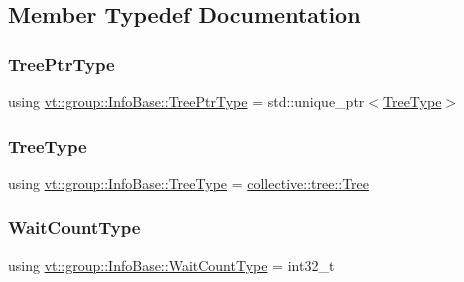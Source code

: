 \subsection{Member Typedef Documentation}
\mbox{\label{structvt_1_1group_1_1_info_base_af1111ac71e1ee7a009f00ebece27c3a3}} 
\subsubsection{\texorpdfstring{Tree\+Ptr\+Type}{TreePtrType}}
{\footnotesize\ttfamily using \hyperlink{structvt_1_1group_1_1_info_base_af1111ac71e1ee7a009f00ebece27c3a3}{vt\+::group\+::\+Info\+Base\+::\+Tree\+Ptr\+Type} =  std\+::unique\+\_\+ptr$<$\hyperlink{structvt_1_1group_1_1_info_base_a96e01b6097ed7b2bc299027d0a7a1b1e}{Tree\+Type}$>$}

\mbox{\label{structvt_1_1group_1_1_info_base_a96e01b6097ed7b2bc299027d0a7a1b1e}} 
\subsubsection{\texorpdfstring{Tree\+Type}{TreeType}}
{\footnotesize\ttfamily using \hyperlink{structvt_1_1group_1_1_info_base_a96e01b6097ed7b2bc299027d0a7a1b1e}{vt\+::group\+::\+Info\+Base\+::\+Tree\+Type} =  \hyperlink{structvt_1_1collective_1_1tree_1_1_tree}{collective\+::tree\+::\+Tree}}

\mbox{\label{structvt_1_1group_1_1_info_base_a0924de8df3a2ec72ebdd499ad8a28abf}} 
\subsubsection{\texorpdfstring{Wait\+Count\+Type}{WaitCountType}}
{\footnotesize\ttfamily using \hyperlink{structvt_1_1group_1_1_info_base_a0924de8df3a2ec72ebdd499ad8a28abf}{vt\+::group\+::\+Info\+Base\+::\+Wait\+Count\+Type} =  int32\+\_\+t}



